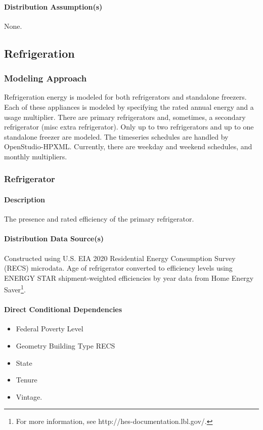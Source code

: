 \paragraph{Distribution Assumption(s)}
None.

\subsection{Refrigeration}
\subsubsection{Modeling Approach}
Refrigeration energy is modeled for both refrigerators and standalone freezers. Each of these appliances is modeled by specifying the rated annual energy and a usage multiplier. There are primary refrigerators and, sometimes, a secondary refrigerator (misc extra refrigerator). Only up to two refrigerators and up to one standalone freezer are modeled. The timeseries schedules are handled by OpenStudio-HPXML. Currently, there are weekday and weekend schedules, and monthly multipliers.

\subsubsection{Refrigerator}
\paragraph{Description}
The presence and rated efficiency of the primary refrigerator.
\paragraph{Distribution Data Source(s)}
Constructed using U.S. EIA 2020 Residential Energy Consumption Survey (RECS) microdata. Age of refrigerator converted to efficiency levels using ENERGY STAR shipment-weighted efficiencies by year data from Home Energy Saver\footnote{For more information, see http://hes-documentation.lbl.gov/.}. 
\paragraph{Direct Conditional Dependencies}
\begin{itemize}
    \item Federal Poverty Level
    \item Geometry Building Type RECS
    \item State
    \item Tenure
    \item Vintage.
\end{itemize} 
